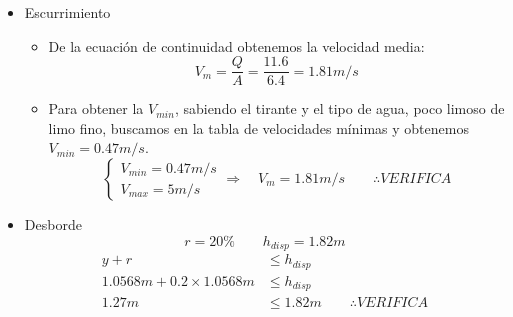 \begin{itemize}
 \item Escurrimiento
    \begin{itemize}
    \item De la ecuación de continuidad obtenemos la velocidad media:
	\begin{equation*}
	V_{m} = \dfrac{Q}{A} = \dfrac{11.6}{6.4} = 1.81 m/s
	\end{equation*}
    \item Para obtener la $V_{min}$, sabiendo el tirante y el tipo de agua, poco limoso de limo fino, buscamos en
    la tabla de velocidades mínimas y obtenemos $V_{min} = 0.47 m/s$.
	\begin{equation*}
	  \begin{cases}
	  V_{min} = 0.47 m/s \\
	  V_{max} = 5 m/s
	  \end{cases}
	  \Longrightarrow \quad
	  V_{m} = 1.81 m/s
	  \qquad
	  \therefore
	  VERIFICA
	\end{equation*}
    \end{itemize}
 \item Desborde
    \begin{equation*}
    r = 20\%
    \qquad
    h_{disp} = 1.82 m
    \end{equation*}
    \begin{align*}
    y + r &\leq h_{disp} \\
    1.0568 m + 0.2 \times 1.0568 m &\leq h_{disp} \\
    1.27 m &\leq 1.82 m
    \qquad
    \therefore
    VERIFICA
    \end{align*}
\end{itemize}


